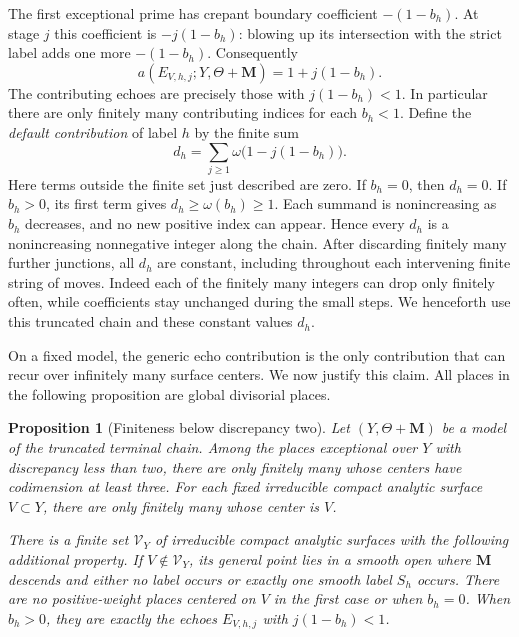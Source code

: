\documentclass[11pt]{amsart}
\newtheorem{proposition}[theorem]{Proposition}
\theoremstyle{definition}
\theoremstyle{remark}
\numberwithin{equation}{section}
\newcommand{\M}{\mathbf{M}}
\begin{document}
The first exceptional prime has crepant boundary coefficient
\(-(1-b_h)\).  At stage \(j\) this coefficient is \(-j(1-b_h)\): blowing
up its intersection with the strict label adds one more \(-(1-b_h)\).
Consequently
\begin{equation}\label{eq:echo-discrepancy}
 a(E_{V,h,j};Y,\Theta+\M)=1+j(1-b_h).
\end{equation}
The contributing echoes are precisely those with \(j(1-b_h)<1\).  In
particular there are only finitely many contributing indices for each
\(b_h<1\).  Define the \emph{default contribution} of label \(h\) by the finite sum
\begin{equation}\label{eq:echo-default}
 d_h=\sum_{j\geq1}\omega\bigl(1-j(1-b_h)\bigr).
\end{equation}
Here terms outside the finite set just described are zero.  If \(b_h=0\),
then \(d_h=0\).  If \(b_h>0\), its first term gives
\(d_h\geq\omega(b_h)\geq1\).  Each summand is nonincreasing as \(b_h\)
decreases, and no new positive index can appear.  Hence every \(d_h\) is a
nonincreasing nonnegative integer along the chain.  After discarding
finitely many further junctions, all \(d_h\) are constant, including
throughout each intervening finite string of moves.  Indeed each of the
finitely many integers can drop only finitely often, while coefficients
stay unchanged during the small steps.  We henceforth use this truncated
chain and these constant values \(d_h\).

On a fixed model, the generic echo contribution is the only contribution
that can recur over infinitely many surface centers.  We now justify this
claim.  All places in the following proposition are
global divisorial places.

\begin{proposition}[Finiteness below discrepancy two]
\label{prop:difficulty-finite}
Let \((Y,\Theta+\M)\) be a model of the truncated terminal chain.
Among the places exceptional over \(Y\) with discrepancy less than two,
there are only finitely many whose centers have codimension at least three.
For each fixed irreducible compact analytic surface \(V\subset Y\), there
are only finitely many whose center is \(V\).

There is a finite set \(\mathcal V_Y\) of irreducible compact analytic
surfaces with the following additional property.  If
\(V\notin\mathcal V_Y\), its general point lies in a smooth open where
\(\M\) descends and either no label occurs or exactly one smooth label
\(S_h\) occurs.  There are no positive-weight places centered on \(V\)
in the first case or when \(b_h=0\).  When \(b_h>0\), they are exactly the
echoes \(E_{V,h,j}\) with \(j(1-b_h)<1\).
\end{proposition}
\end{document}
